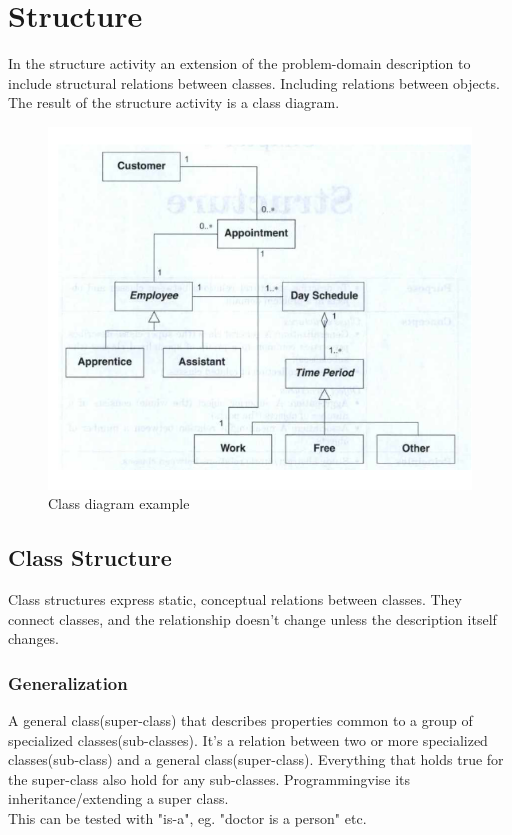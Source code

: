\chapter{Structure \ooad[71]}\label{chp:structure}
In the structure activity an extension of the problem-domain description to include structural relations between classes. Including relations between objects. The result of the structure activity is a class diagram.

\begin{figure}[H]
    \center
    \includegraphics[width=\linewidth*3/4]{parts/2_problem_domain_analysis/structure/figures/class_diagram.png}
    \caption{Class diagram example \ooad[72]}
    \label{fig:structure_class_diagram}
\end{figure}

\section{Class Structure}
Class structures express static, conceptual relations between classes. They connect classes, and the relationship doesn't change unless the description itself changes.

\subsection*{Generalization}
A general class(super-class) that describes properties common to a group of specialized classes(sub-classes). It's a relation between two or more specialized classes(sub-class) and a general class(super-class). Everything that holds true for the super-class also hold for any sub-classes. Programmingvise its inheritance/extending a super class.\\
This can be tested with "is-a", eg. "doctor is a person" etc.

